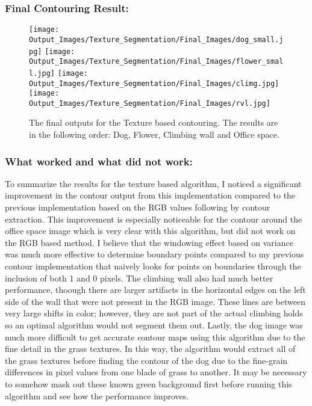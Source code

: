 \documentclass{article}
\begin{document}
\subsubsection{Final Contouring Result:}
\begin{figure}[H]
    \centering
    \texttt{[image: Output\_Images/Texture\_Segmentation/Final\_Images/dog\_small.jpg]}
    \texttt{[image: Output\_Images/Texture\_Segmentation/Final\_Images/flower\_small.jpg]}
    \texttt{[image: Output\_Images/Texture\_Segmentation/Final\_Images/climg.jpg]}
    \texttt{[image: Output\_Images/Texture\_Segmentation/Final\_Images/rvl.jpg]}
    \caption{The final outputs for the Texture based contouring. The results are in the following order: Dog, Flower, Climbing wall and Office space.}
\end{figure}

\subsubsection{What worked and what did not work:}
To summarize the results for the texture based algorithm, I noticed a significant improvement in the contour output
from this implementation compared to the previous implementation based on the RGB values following by contour extraction. 
This improvement is especially noticeable for the contour around the office space image which is very clear with this algorithm,
but did not work on the RGB based method. I believe that the windowing effect based on variance was much more effective to 
determine boundary points compared to my previous contour implementation that naively looks for points on boundaries through the
inclusion of both 1 and 0 pixels. The climbing wall also had much better performance, thoough there are larger artifacts in the horizontal
edges on the left side of the wall that were not present in the RGB image. These lines are between very large shifts in color; however, they
are not part of the actual climbing holds so an optimal algorithm would not segment them out. Lastly, the dog image was much more difficult to 
get accurate contour maps using this algorithm due to the fine detail in the grass textures. In this way, the algorithm would extract all of the
grass textures before finding the contour of the dog due to the fine-grain differences in pixel values from one blade of grass to another. It may
be necessary to somehow mask out these known green background first before running this algorithm and see how the performance improves.
\end{document}
